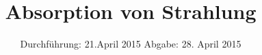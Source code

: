 
\subject{Anfängerpraktikum V704}
\title{Absorption von Strahlung}
\date{
  Durchführung: 21.April 2015
  \hspace{3em}
  Abgabe: 28. April 2015
}


\maketitle
\thispagestyle{empty}
\newpage





\nocite{skript}
\printbibliography

